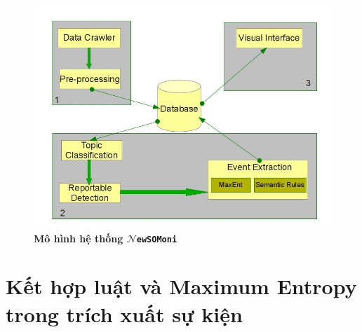 \begin{figure}[htbp]
		\centering
		\includegraphics[width=1\textwidth]{system}
		\caption{\textbf{Mô hình hệ thống  $\mathcal{N}$\texttt{ewSOMoni}}}
		\label{system}
\end{figure}




\section{Kết hợp luật và Maximum Entropy trong trích xuất sự kiện}
\label{method}

